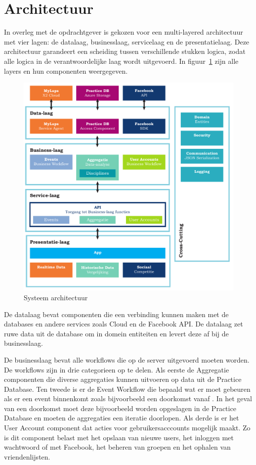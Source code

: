\section{Architectuur}
In overleg met de opdrachtgever is gekozen voor een multi-layered architectuur met
vier lagen: de datalaag, businesslaag, servicelaag en de presentatielaag. Deze 
architectuur garandeert een scheiding tussen verschillende stukken logica, zodat 
alle logica in de verantwoordelijke laag wordt uitgevoerd. In figuur~\ref{fig:architecture} zijn alle layers en hun componenten weergegeven.

\begin{figure}
\centering
\includegraphics[width=\textwidth]{style/images/Architectuur}
\caption{Systeem architectuur}
\label{fig:architecture}
\end{figure}

De datalaag bevat componenten die een  verbinding kunnen maken met de databases en 
andere services zoals \mylaps Cloud en de Facebook API. De datalaag zet ruwe data 
uit de database om in domein entiteiten en levert deze af bij de businesslaag.

De businesslaag bevat alle workflows die op de server uitgevoerd moeten worden. 
De workflows zijn in drie categorieen op te delen. Als eerste de Aggregatie
componenten die diverse aggregaties kunnen uitvoeren op data uit de Practice
Database. Ten tweede is er de Event Workflow die bepaald wat er moet gebeuren als
er een event binnenkomt zoals bijvoorbeeld een doorkomst vanaf \mylaps. In het
geval van een doorkomst moet deze bijvoorbeeld worden opgeslagen in de Practice
Database en moeten de aggregaties een iteratie doorlopen. Als derde is er het User
Account component dat acties voor gebruikersacccounts mogelijk maakt. Zo is dit
component belast met het opslaan van nieuwe users, het inloggen met wachtwoord of
met Facebook, het beheren van groepen en het ophalen van vriendenlijsten.

